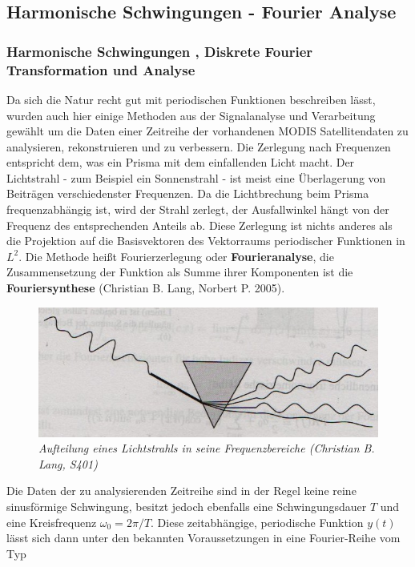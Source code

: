 \documentclass[11pt]{report}
\begin{document}
\subsection{Harmonische Schwingungen - Fourier Analyse
}
\subsubsection{Harmonische Schwingungen , Diskrete Fourier Transformation und Analyse}
Da sich die Natur recht gut mit periodischen Funktionen beschreiben lässt, wurden auch hier einige Methoden aus der Signalanalyse und Verarbeitung gewählt um die Daten einer Zeitreihe der vorhandenen MODIS Satellitendaten zu analysieren, rekonstruieren und zu verbessern. Die Zerlegung nach Frequenzen entspricht dem, was ein Prisma mit dem einfallenden Licht macht. Der Lichtstrahl - zum Beispiel ein Sonnenstrahl - ist meist eine Überlagerung von Beiträgen verschiedenster Frequenzen. Da die Lichtbrechung beim Prisma frequenzabhängig ist, wird der Strahl zerlegt, der Ausfallwinkel hängt von der Frequenz des entsprechenden Anteils ab. Diese Zerlegung ist nichts anderes als die Projektion auf die Basisvektoren des Vektorraums periodischer Funktionen in $L^{2}$. Die Methode heißt Fourierzerlegung oder \textbf{Fourieranalyse}, die Zusammensetzung der Funktion als Summe ihrer Komponenten ist die \textbf{Fouriersynthese} (Christian B. Lang, Norbert P. 2005). 


\begin{figure}[H]
\centering
\includegraphics[scale=0.6]{./Grafiken/Fitting/FFT/prisma_cut.jpg}
\caption{\textit{Aufteilung eines Lichtstrahls in seine Frequenzbereiche (Christian B. Lang, S401)}}
\end{figure}

Die Daten der zu analysierenden Zeitreihe sind in der Regel keine reine sinusförmige Schwingung, besitzt jedoch ebenfalls eine Schwingungsdauer $T$ und eine Kreisfrequenz $\omega_0=2\pi / T$. Diese zeitabhängige, periodische Funktion $y(t)$ lässt sich dann unter den bekannten Voraussetzungen in eine Fourier-Reihe vom Typ
\end{document}
